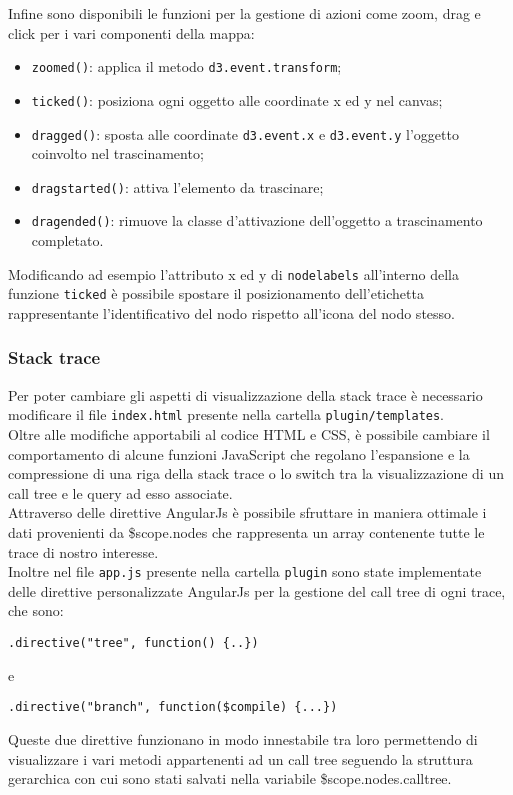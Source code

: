 Infine sono disponibili le funzioni per la gestione di azioni come zoom, drag e click per i vari componenti della mappa:
\begin{itemize}
	\item \texttt{zoomed()}: applica il metodo \texttt{d3.event.transform};
	\item \texttt{ticked()}: posiziona ogni oggetto alle coordinate x ed y nel canvas;
	\item \texttt{dragged()}: sposta alle coordinate \texttt{d3.event.x} e \texttt{d3.event.y} l'oggetto coinvolto nel trascinamento;
	\item \texttt{dragstarted()}: attiva l'elemento da trascinare;
	\item \texttt{dragended()}: rimuove la classe d'attivazione dell'oggetto a trascinamento completato.
\end{itemize}
Modificando ad esempio l'attributo x ed y di \texttt{nodelabels} all'interno della funzione \texttt{ticked} è possibile spostare il posizionamento dell'etichetta rappresentante l'identificativo del nodo rispetto all'icona del nodo stesso.\\

\subsubsection{Stack trace}
\label{sec:stack}
Per poter cambiare gli aspetti di visualizzazione della stack trace è necessario modificare il file \texttt{index.html} presente nella cartella \texttt{plugin/templates}.\\
Oltre alle modifiche apportabili al codice HTML e CSS, è possibile cambiare il comportamento di alcune funzioni JavaScript che regolano l'espansione e la compressione di una riga della stack trace o lo switch tra la visualizzazione di un call tree e le query ad esso associate.\\
Attraverso delle direttive AngularJs è possibile sfruttare in maniera ottimale i dati provenienti da \$scope.nodes che rappresenta un array contenente tutte le trace di nostro interesse.\\
Inoltre nel file \texttt{app.js} presente nella cartella \texttt{plugin} sono state implementate delle direttive personalizzate AngularJs per la gestione del call tree di ogni trace, che sono:
\begin{lstlisting}
.directive("tree", function() {..})
\end{lstlisting}
e
\begin{lstlisting}
.directive("branch", function($compile) {...})
\end{lstlisting}
Queste due direttive funzionano in modo innestabile tra loro permettendo di visualizzare i vari metodi appartenenti ad un call tree seguendo la struttura gerarchica con cui sono stati salvati nella variabile \$scope.nodes.calltree.


